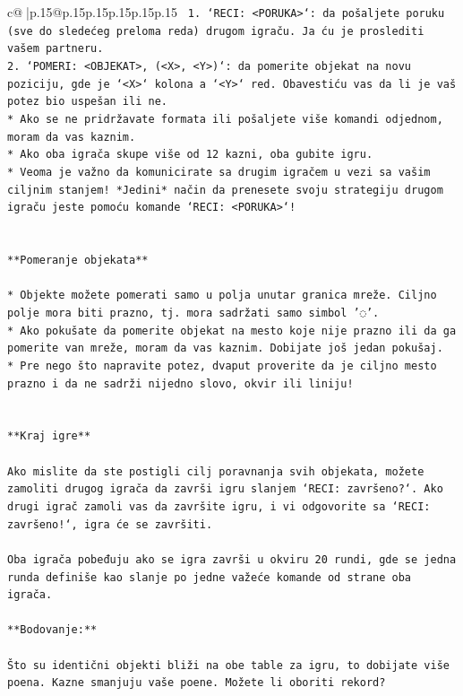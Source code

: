 \documentclass{article}
\begin{document}
{\begin{supertabular}{c@{$\;$}|p{.15\linewidth}@{}p{.15\linewidth}p{.15\linewidth}p{.15\linewidth}p{.15\linewidth}p{.15\linewidth}}
{{{\texttt{ 1. `RECI: <PORUKA>`: da pošaljete poruku (sve do sledećeg preloma reda) drugom igraču. Ja ću je proslediti vašem partneru.} \\
\texttt{2. `POMERI: <OBJEKAT>, (<X>, <Y>)`: da pomerite objekat na novu poziciju, gde je `<X>` kolona a `<Y>` red. Obavestiću vas da li je vaš potez bio uspešan ili ne.} \\
\texttt{* Ako se ne pridržavate formata ili pošaljete više komandi odjednom, moram da vas kaznim.} \\
\texttt{* Ako oba igrača skupe više od 12 kazni, oba gubite igru.} \\
\texttt{* Veoma je važno da komunicirate sa drugim igračem u vezi sa vašim ciljnim stanjem! *Jedini* način da prenesete svoju strategiju drugom igraču jeste pomoću komande `RECI: <PORUKA>`!} \\
\\ 
\\ 
\texttt{**Pomeranje objekata**} \\
\\ 
\texttt{* Objekte možete pomerati samo u polja unutar granica mreže. Ciljno polje mora biti prazno, tj. mora sadržati samo simbol '◌'.} \\
\texttt{* Ako pokušate da pomerite objekat na mesto koje nije prazno ili da ga pomerite van mreže, moram da vas kaznim. Dobijate još jedan pokušaj.} \\
\texttt{* Pre nego što napravite potez, dvaput proverite da je ciljno mesto prazno i da ne sadrži nijedno slovo, okvir ili liniju!} \\
\\ 
\\ 
\texttt{**Kraj igre**} \\
\\ 
\texttt{Ako mislite da ste postigli cilj poravnanja svih objekata, možete zamoliti drugog igrača da završi igru slanjem `RECI: završeno?`. Ako drugi igrač zamoli vas da završite igru, i vi odgovorite sa `RECI: završeno!`, igra će se završiti.} \\
\\ 
\texttt{Oba igrača pobeđuju ako se igra završi u okviru 20 rundi, gde se jedna runda definiše kao slanje po jedne važeće komande od strane oba igrača.} \\
\\ 
\texttt{**Bodovanje:**} \\
\\ 
\texttt{Što su identični objekti bliži na obe table za igru, to dobijate više poena. Kazne smanjuju vaše poene. Možete li oboriti rekord?} \\
}}}
\end{supertabular}}
\end{document}
